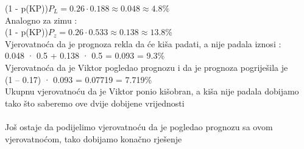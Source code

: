 \documentclass[12pt]{article}
\begin{document}
\begin{enumerate}
\begin{center}
{ (1 - p(KP))$P_L = 0.26 \cdot 0.188 \approx 0.048 \approx 4.8\%$
 \\ \vspace{0.25cm}
 Analogno za zimu : \\
 (1 - p(KP))$P_z = 0.26 \cdot 0.533 \approx 0.138 \approx 13.8\%$
 \\ \vspace{0.25cm}
 Vjerovatnoća da je prognoza rekla da će kiša padati, a nije padala iznosi :
 \\ \vspace{0.15cm}
 0.048 · 0.5 + 0.138 · 0.5 = 0.093 = 9.3\%
 \\ \vspace{0.25cm}
  Vjerovatnoća da je Viktor pogledao prognozu i da je prognoza pogriješila je
  \\ \vspace{0.15cm}
  (1 – 0.17) · 0.093 = 0.07719 = 7.719\%
  \\ \vspace{0.25cm}
  Ukupnu vjerovatnoću da je Viktor ponio kišobran, a kiša nije padala
dobijamo tako što saberemo ove dvije dobijene vrijednosti
\\ \vspace{0.25cm}
 \\ \vspace{0.25cm}
 Još ostaje da podijelimo vjerovatnoću da je pogledao prognozu sa ovom vjerovatnoćom, tako dobijamo konačno rješenje 
 \\ \vspace{0.25cm}

		}
		\end{center}
		
	\end{enumerate}
	
	
	
    
\end{document}
